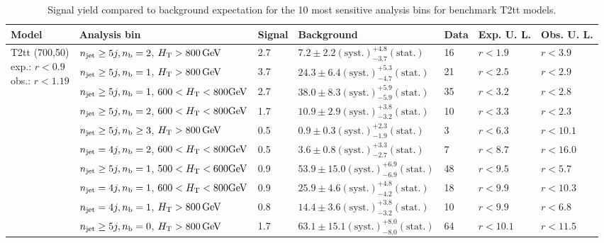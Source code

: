 \begin{table}[h!] 
  \scriptsize
  \caption{ 
Signal yield compared to background expectation for the 10 most sensitive analysis bins 
for benchmark T2tt models.
  \label{tab:sigBenchmarksYields_T2tt}}
  \centering 
  \begin{tabular}{ lllllll } 
    \hline 
    \hline 
    Model & Analysis bin & Signal & Background & Data & Exp. U. L. & Obs. U. L. \\ \hline
\multirow{10}{*}{\parbox[t]{2cm}{T2tt (700,50)\\exp.: $r<0.9$\\obs.: $r<1.19$}}
 & $n_{\mathrm{jet}} \geq5j,n_{\text{b}} =2$, $\mbox{$H_\text{T}$} > 800 \, \mathrm{GeV}$ & 2.7 & $7.2 \pm 2.2 \mathrm{(syst.)} ^{+4.8}_{-3.7} \mathrm{(stat.)}$ & 16 & $r < 1.9$ & $r < 3.9$\\ 
 & $n_{\mathrm{jet}} \geq5j,n_{\text{b}} =1$, $\mbox{$H_\text{T}$} > 800 \, \mathrm{GeV}$ & 3.7 & $24.3 \pm 6.4 \mathrm{(syst.)} ^{+5.3}_{-4.7} \mathrm{(stat.)}$ & 21 & $r < 2.5$ & $r < 2.9$\\ 
 & $n_{\mathrm{jet}} \geq5j,n_{\text{b}} =1$, $600 < \mbox{$H_\text{T}$} < 800 \mathrm{GeV}$ & 2.7 & $38.0 \pm 8.3 \mathrm{(syst.)} ^{+5.9}_{-5.9} \mathrm{(stat.)}$ & 35 & $r < 3.2$ & $r < 2.8$\\ 
 & $n_{\mathrm{jet}} \geq5j,n_{\text{b}} =2$, $600 < \mbox{$H_\text{T}$} < 800 \mathrm{GeV}$ & 1.7 & $10.9 \pm 2.9 \mathrm{(syst.)} ^{+3.8}_{-3.2} \mathrm{(stat.)}$ & 10 & $r < 3.3$ & $r < 2.3$\\ 
 & $n_{\mathrm{jet}} \geq5j,n_{\text{b}} \geq3$, $\mbox{$H_\text{T}$} > 800 \, \mathrm{GeV}$ & 0.5 & $0.9 \pm 0.3 \mathrm{(syst.)} ^{+2.3}_{-1.9} \mathrm{(stat.)}$ & 3 & $r < 6.3$ & $r < 10.1$\\ 
 & $n_{\mathrm{jet}} =4j,n_{\text{b}} =2$, $600 < \mbox{$H_\text{T}$} < 800 \mathrm{GeV}$ & 0.5 & $3.6 \pm 0.8 \mathrm{(syst.)} ^{+3.3}_{-2.7} \mathrm{(stat.)}$ & 7 & $r < 8.7$ & $r < 16.0$\\ 
 & $n_{\mathrm{jet}} \geq5j,n_{\text{b}} =1$, $500 < \mbox{$H_\text{T}$} < 600 \mathrm{GeV}$ & 0.9 & $53.9 \pm 15.0 \mathrm{(syst.)} ^{+6.9}_{-6.9} \mathrm{(stat.)}$ & 48 & $r < 9.5$ & $r < 5.7$\\ 
 & $n_{\mathrm{jet}} =4j,n_{\text{b}} =1$, $600 < \mbox{$H_\text{T}$} < 800 \mathrm{GeV}$ & 0.9 & $25.9 \pm 4.6 \mathrm{(syst.)} ^{+4.8}_{-4.2} \mathrm{(stat.)}$ & 18 & $r < 9.9$ & $r < 10.3$\\ 
 & $n_{\mathrm{jet}} =4j,n_{\text{b}} =1$, $\mbox{$H_\text{T}$} > 800 \, \mathrm{GeV}$ & 0.8 & $14.4 \pm 3.6 \mathrm{(syst.)} ^{+3.8}_{-3.2} \mathrm{(stat.)}$ & 10 & $r < 9.9$ & $r < 6.8$\\ 
 & $n_{\mathrm{jet}} \geq5j,n_{\text{b}} =0$, $\mbox{$H_\text{T}$} > 800 \, \mathrm{GeV}$ & 1.7 & $63.1 \pm 15.1 \mathrm{(syst.)} ^{+8.0}_{-8.0} \mathrm{(stat.)}$ & 64 & $r < 10.1$ & $r < 11.5$\\ \hline

\end{tabular}
\end{table}
